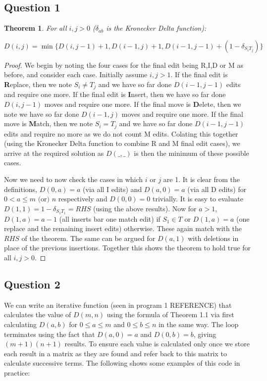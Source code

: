 \documentclass{article}
\newtheorem{theorem}{Theorem}[section]
\begin{document}
\subsection{Question 1}
\begin{theorem}
For all $i,j>0$ ($\delta_{ab}$ is the Kronecker Delta function):
 
$D(i,j) = \min \{D(i,j-1)+1, D(i-1,j)+1, D(i-1,j-1)+(1-\delta_{S_i T_j})\}$
\end{theorem}

\begin{proof}
We begin by noting the four cases for the final edit being R,I,D or M as before, and consider each case. Initially assume $i,j>1$. If the final edit is \textbf{R}eplace, then we note $S_i \neq T_j$ and we have so far done $D(i-1,j-1)$ edits and require one more. If the final edit is \textbf{I}nsert, then we have so far done $D(i,j-1)$ moves and require one more. If the final move is \textbf{D}elete, then we note we have so far done $D(i-1,j)$ moves and require one more. If the final move is \textbf{M}atch, then we note $S_i=T_j$ and we have so far done $D(i-1,j-1)$ edits and require no more as we do not count M edits. Colating this together (using the Kronecker Delta function to combine R and M final edit cases), we arrive at the required solution as $D(\_,\_)$ is then the minimum of these possible cases. 

Now we need to now check the cases in which $i$ or $j$ are 1. It is clear from the definitions, $D(0,a)=a$ (via all I edits) and $D(a,0)=a$ (via all D edits) for $0 < a \leq m \text{ (or) } n$ respectively and $D(0,0)=0$ trivially. It is easy to evaluate $D(1,1)=1-\delta_{S_1 T_1}=RHS$ (using the above results). Now for $a>1$, $D(1,a)=a-1$ (all inserts bar one match edit) if $S_1 \in T$ or $D(1,a)=a$ (one replace and the remaining insert edits) otherwise. These again match with the $RHS$ of the theorem. The same can be argued for $D(a,1)$ with deletions in place of the previous insertions. Together this shows the theorem to hold true for all $i,j>0$.
\end{proof}


\subsection{Question 2}

We can write an iterative function (seen in program 1 REFERENCE) that calculates the value of $D(m,n)$ using the formula of Theorem 1.1 via first calculating $D(a,b)$ for $0 \leq a \leq m$ and $0 \leq b \leq n$ in the same way. The loop terminates using the fact that $D(a,0)=a$ and $D(0,b)=b$, giving $(m+1)(n+1)$ results. To ensure each value is calculated only once we store each result in a matrix as they are found and refer back to this matrix to calculate successive terms. The following shows some examples of this code in practice:
\end{document}
